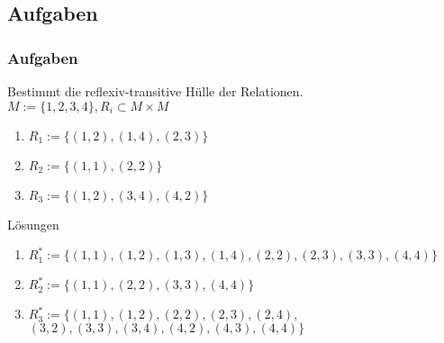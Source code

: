 \subsection{Aufgaben}
\begin{frame}
	\frametitle{Aufgaben}
  \begin{exampleblock}{}
    Bestimmt die reflexiv-transitive Hülle der Relationen.\\
    $M := \{1, 2, 3, 4\}, R_i \subset M \times M$
    \begin{enumerate}
      \item $R_1 := \{(1, 2), (1, 4), (2, 3)\}$
      \item $R_2 := \{(1, 1), (2, 2)\}$
      \item $R_3 := \{(1, 2), (3, 4), (4, 2)\}$
    \end{enumerate}
  \end{exampleblock}\pause
  \begin{exampleblock}{Lösungen}
    \begin{enumerate}
      \item $R_1^* := \{(1, 1), (1, 2), (1, 3), (1, 4), (2, 2), (2, 3), (3, 3), (4, 4)\}$
      \item $R_2^* := \{(1, 1), (2, 2), (3, 3), (4, 4)\}$
      \item $R_3^* := \{(1, 1), (1, 2), (2, 2), (2, 3), (2, 4),$
            $ (3, 2), (3, 3), (3, 4), (4, 2), (4, 3), (4, 4)\}$
    \end{enumerate}
  \end{exampleblock}
\end{frame}
